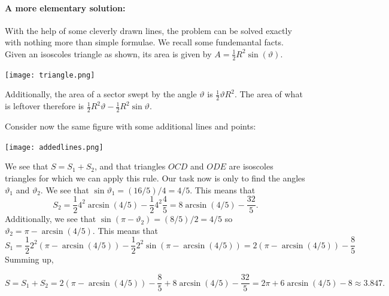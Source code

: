 \documentclass[letterpaper,twoside,11pt]{article}
\theoremstyle{mystyle}
\begin{document}
\paragraph*{A more elementary solution:} With the help of some cleverly drawn lines, the problem can be solved exactly with nothing more than simple formulae. We recall some fundemantal facts. Given an isoscoles triangle as shown, its area is given by $A = \frac{1}{2}R^2 \sin(\vartheta)$. 
\begin{center}
  \texttt{[image: triangle.png]}
\end{center}
Additionally, the area of a sector swept by the angle $\vartheta$ is $\frac{1}{2}\vartheta R^2$. The area of what is leftover therefore is $\frac{1}{2}R^2 \vartheta - \frac{1}{2}R^2 \sin\vartheta$.

Consider now the same figure with some additional lines and points: 
\begin{center}
  \texttt{[image: addedlines.png]}
\end{center}
We see that $S = S_1 + S_2$, and that triangles $OCD$ and $ODE$ are isoscoles triangles for which we can apply this rule. Our task now is only to find the angles $\vartheta_1$ and $\vartheta_2$. 
We see that $\sin\vartheta_1 = (16/5)/4 = 4/5$. This means that 
\[S_2 = \frac{1}{2}4^2 \arcsin(4/5) - \frac{1}{2}4^2\frac{4}{5} = 8\arcsin(4/5) - \frac{32}{5}.\]
Additionally, we see that $\sin(\pi - \vartheta_2) = (8/5)/2 = 4/5$ so $\vartheta_2 = \pi - \arcsin(4/5)$. This means that 
\[S_1 = \frac{1}{2}2^2 (\pi - \arcsin(4/5)) - \frac{1}{2}2^2\sin(\pi - \arcsin(4/5)) = 2(\pi - \arcsin(4/5)) - \frac{8}{5}\]
Summing up, 

\[S = S_1 + S_2 = 2(\pi - \arcsin(4/5)) - \frac{8}{5} + 8\arcsin(4/5) - \frac{32}{5} = 2\pi + 6\arcsin(4/5) -8 \approx 3.847.\]
\end{document}
